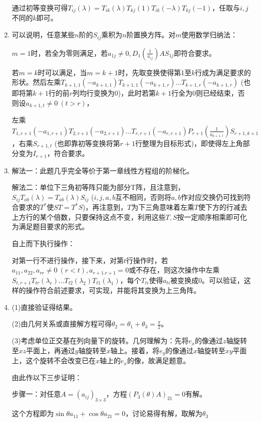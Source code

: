 \documentclass[a4paper,UTF8,fontset=windows]{ctexart}
\begin{document}
\begin{enumerate}
通过初等变换可得$T_{ij}(\lambda)=T_{ik}(\lambda)T_{kj}(1)T_{ik}(-\lambda)T_{kj}(-1)$，任取与$i,j$不同的$k$即可。

\item
可以说明，任意某些$n$阶的$S_{ij}$乘积为$n$阶置换方阵。对$m$使用数学归纳法：

$m=1$时，若全为零则满足，若$a_{1j}\ne0,D_1(\frac{1}{a_{ij}})AS_{1j}$即符合要求。

若$m=k$时可以满足，当$m=k+1$时，先取变换使得第1至$k$行成为满足要求的形状。然后左乘$T_{k+1,1}(-a_{k+1,1})T_{k+1,1}(-a_{k+1,r})\dots T_{k+1,r}(-a_{k+1,r})$ (也即将第$k+1$行的前$r$列均行变换为0)，此时若第$k+1$行全为0则已经结束，否则设$a_{k+1,t}\ne0\ (t>r)$，

左乘$T_{1,r+1}(-a_{1,r+1})T_{2,r+1}(-a_{2,r+1})\dots T_{r,r+1}(-a_{r,r+1})P_{r+1}\left(\frac{1}{a_{k+1,t}}\right)S_{r+1,k+1}$，右乘$S_{r+1,t}$ (也即靠初等变换将第$r+1$行整理为目标形式)，即使得左上角部分变为$I_{r+1}$，符合要求。

\item
解法一：此题几乎完全等价于第一章线性方程组的阶梯化。

解法二：单位下三角初等阵只能为部分T阵，且注意到，$S_{ij}T_{ab}(\lambda)=T_{ab}(\lambda)S_{ij}$ ($i,j,a,b$互不相同，否则将$a,b$作对应交换仍可找到符合要求的$T^\ast$使$ST=T^\ast S$)，再注意到，$T$为下三角意味着左乘$T$使下方的行减去上方行的某个倍数，只要保持这点不变，利用这些$T,S$按一定顺序相乘即可化为满足题目要求的形式。

自上而下执行操作：

对第一行不进行操作，接下来，对第$t$行操作时，若$a_{11},a_{22},a_{rr}\ne0\ (r<t),a_{r+1.r+1}=0$或不存在，则这次操作中左乘$S_{t,r+1}T_{tr}(\lambda_r)\dots T_{t2}(\lambda_2)T_{t1}(\lambda_1)$，每个$T_{ti}$使得$a_{ti}$被变换成0。可以验证，这样的操作符合前述要求，可实现，并能将其变换为上三角阵。

\item
(1)直接验证得结果。

(2)由几何关系或直接解方程可得$\theta_2=\theta_1+\theta_3=\frac{\pi}{2}$。

(3)考虑单位正交基在列向量下的旋转。几何理解为：先将$e_x$的像通过$z$轴旋转至$xz$平面上，再通过$y$轴旋转至$x$轴上。接着，将$e_y$的像通过$x$轴旋转至$xy$平面上，这个旋转不会改变已在$x$轴上的$e_x$的像，故满足题意。

由此作以下三步证明：

步骤一：对任意$A=\left(a_{ij}\right)_{3\times3}$，方程$\left(P_3(\theta)A\right)_{21}=0$有解。

这个方程即为$\sin{\theta}a_{11}+\cos{\theta}a_{21}=0$，讨论易得有解，取解为$\theta_3$


\end{enumerate}
\end{document}

